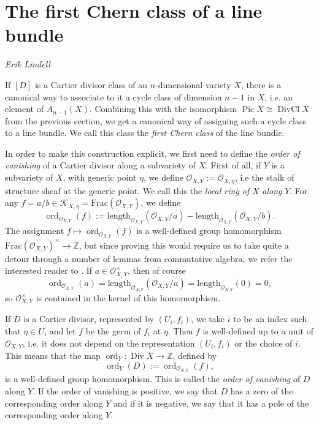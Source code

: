 \documentclass[a4paper,openany]{scrbook}
\DeclareMathOperator{\Div}{Div}
\DeclareMathOperator{\DivCl}{DivCl}
\DeclareMathOperator{\Pic}{Pic}
\DeclareMathOperator{\ord}{ord}
\newcommand{\chapterauthor}[1]{\hfill\emph{#1}\par\noindent}
\begin{document}
\section{The first Chern class of a line bundle}
\chapterauthor{Erik Lindell}

If $[D]$ is a Cartier divisor class of an $n$-dimensional variety $X$, there is a canonical way to associate to it a cycle class of dimension $n-1$ in $X$, i.e. an element of $A_{n-1}(X)$. Combining this with the isomorphism $\Pic X\cong\DivCl X$ from the previous section, we get a canonical way of assigning such a cycle class to a line bundle. We call this class the \textit{first Chern class} of the line bundle. 

In order to make this construction explicit, we first need to define the \textit{order of vanishing} of a Cartier divisor along a subvariety of $X$. First of all, if $Y$ is a subvariety of $X$, with generic point $\eta$, we define $\mathcal{O}_{X,Y}:=\mathcal{O}_{X,\eta}$, i.e the stalk of structure sheaf at the generic point. We call this the \textit{local ring of }$X$\textit{ along }$Y$. For any $f=a/b\in\mathcal{K}_{X,\eta}=\mathrm{Frac}(\mathcal{O}_{X,Y})$, we define
$$\ord_{\mathcal{O}_{X,Y}}(f):=\mathrm{length}_{\mathcal{O}_{X,Y}}(\mathcal{O}_{X,Y}/a)-\mathrm{length}_{\mathcal{O}_{X,Y}}(\mathcal{O}_{X,Y}/b).$$
The assignment $f\mapsto\ord_{\mathcal{O}_{X,Y}}(f)$ is a well-defined group homomorphism $\mathrm{Frac}(\mathcal{O}_{X,Y})^\times\to\mathbb{Z}$, but since proving this would require us to take quite a detour through a number of lemmas from commutative algebra, we refer the interested reader to \cite[Appendix A]{fulton:intersection-theory}. If $a\in\mathcal{O}_{X,Y}^\times$, then of course
$$\ord_{\mathcal{O}_{X,Y}}(a)=\mathrm{length}_{\mathcal{O}_{X,Y}}(\mathcal{O}_{X,Y}/a)=\mathrm{length}_{\mathcal{O}_{X,Y}}(0)=0,$$
so $\mathcal{O}_{X,Y}^\times$ is contained in the kernel of this homomorphism.

If $D$ is a Cartier divisor, represented by $(U_i,f_i)$, we take $i$ to be an index such that $\eta\in U_i$ and let $f$ be the germ of $f_i$ at $\eta$. Then $f$ is well-defined up to a unit of $\mathcal{O}_{X,Y}$, i.e. it does not depend on the representation $(U_i,f_i)$ or the choice of $i$. This means that the map $\ord_Y:\Div X\to\mathbb{Z}$, defined by 
$$\ord_Y(D):=\ord_{\mathcal{O}_{X,Y}}(f),$$
is a well-defined group homomorphism. This is called the \textit{order of vanishing} of $D$ along $Y$. If the order of vanishing is positive, we say that $D$ has a zero of the corresponding order along $Y$ and if it is negative, we say that it has a pole of the corresponding order along $Y$. 
\end{document}
